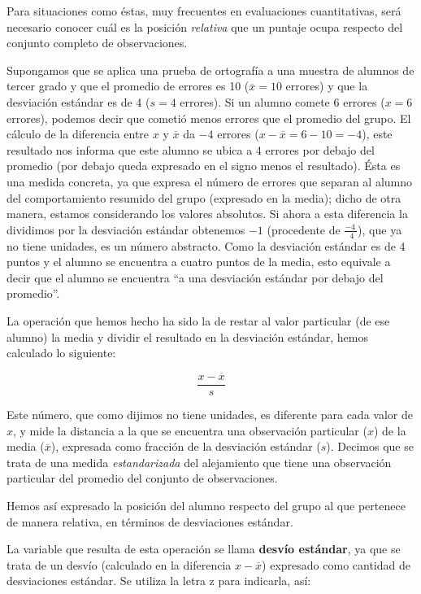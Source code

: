 \documentclass[]{book}
\begin{document}
Para situaciones como éstas, muy frecuentes en evaluaciones
cuantitativas, será necesario conocer cuál es la posición \emph{relativa} que un puntaje ocupa respecto del conjunto completo de observaciones.

Supongamos que se aplica una prueba de ortografía a una muestra de
alumnos de tercer grado y que el promedio de errores es 10
(\(\overline{x} = 10\) errores) y que la desviación estándar es de 4
(\(s = 4\) errores). Si un alumno comete 6 errores (\(x = 6\) errores),
podemos decir que cometió menos errores que el promedio del grupo. El
cálculo de la diferencia entre \(x\) y \(\overline{x}\) da \(-4\) errores
(\(x - \overline{x} = 6 - 10 = - 4\)), este resultado nos informa que este alumno se ubica a 4 errores por debajo del promedio (por debajo queda expresado en el signo menos el resultado). Ésta es una medida concreta, ya que expresa el número de errores que separan al alumno del comportamiento resumido del grupo (expresado en la media); dicho de otra manera, estamos considerando los valores absolutos. Si ahora a esta diferencia la dividimos por la desviación estándar obtenemos \(-1\) (procedente de \(\frac{- 4\ }{\ \ 4\ }\)), que ya no tiene unidades, es un número abstracto. Como la desviación estándar es de 4 puntos y el alumno se encuentra a cuatro puntos de la media, esto equivale a decir que el alumno se encuentra ``a una desviación estándar por debajo del promedio''.

La operación que hemos hecho ha sido la de restar al valor particular
(de ese alumno) la media y dividir el resultado en la desviación
estándar, hemos calculado lo siguiente:

\[\frac{x - \overline{x}}{s}\]

Este número, que como dijimos no tiene unidades, es diferente para cada valor de \(x\), y mide la distancia a la que se encuentra una observación particular (\(x\)) de la media (\(\overline{x}\)), expresada como fracción de la desviación estándar (\(s\)). Decimos que se trata de una medida \emph{estandarizada} del alejamiento que tiene una observación particular del promedio del conjunto de observaciones.

Hemos así expresado la posición del alumno respecto del grupo al que
pertenece de manera relativa, en términos de desviaciones estándar.

La variable que resulta de esta operación se llama \textbf{desvío estándar}, ya que se trata de un desvío (calculado en la diferencia \(x - \overline{x}\)) expresado como cantidad de desviaciones estándar. Se utiliza la letra z para indicarla, así:
\end{document}

